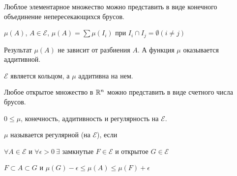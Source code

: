 Люблое элементарное множество можно представить в виде конечного объединение непересекающихся брусов.


$\mu(A)$, $A \in \mathcal{E}$, $\mu(A) = \sum \mu(I_i)$ при $I_i \cap I_j = \emptyset (i \ne j)$

Результат $\mu(A)$ не зависит от разбиения $A$. А функция $\mu$ оказывается аддитивной.

$\mathcal{E}$ является кольцом, а $\mu$ аддитивна на нем.

\begin{problem}
  Любое открытое множество в $\mathbb{R}^n$ можно представить в виде счетного числа брусов.
\end{problem}

$0 \leq \mu$, конечность, аддитивность и регулярность на $\mathcal{E}$.

\begin{definition}
  $\mu$ называется регулярной (на $\mathcal{E}$), если 

  $\forall A \in \mathcal{E}$ и $\forall \epsilon>0\ \exists\text{ замкнутые } F \in \mathcal{E} \text{ и открытое } G \in \mathcal{E}$

  $F \subset A \subset G$ и $\mu(G) - \epsilon \leq \mu(A) \leq \mu(F) + \epsilon$
\end{definition}